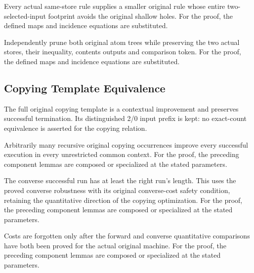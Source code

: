Every actual same-store rule supplies a smaller original rule whose entire two-selected-input footprint avoids the original shallow holes.
For the proof, the defined maps and incidence equations are substituted.
\par{}

Independently prune both original atom trees while preserving the two actual stores, their inequality, contents outputs and comparison token.
For the proof, the defined maps and incidence equations are substituted.
\par{}

\subsection{Copying Template Equivalence}
The full original copying template is a contextual improvement and preserves successful termination. Its distinguished 2/0 input prefix is kept: no exact-count equivalence is asserted for the copying relation.

Arbitrarily many recursive original copying occurrences improve every successful execution in every unrestricted common context.
For the proof, the preceding component lemmas are composed or specialized at the stated parameters.
\par{}

The converse successful run has at least the right run's length. This uses the proved converse robustness with its original converse-cost safety condition, retaining the quantitative direction of the copying optimization.
For the proof, the preceding component lemmas are composed or specialized at the stated parameters.
\par{}

Costs are forgotten only after the forward and converse quantitative comparisons have both been proved for the actual original machine.
For the proof, the preceding component lemmas are composed or specialized at the stated parameters.
\par{}

